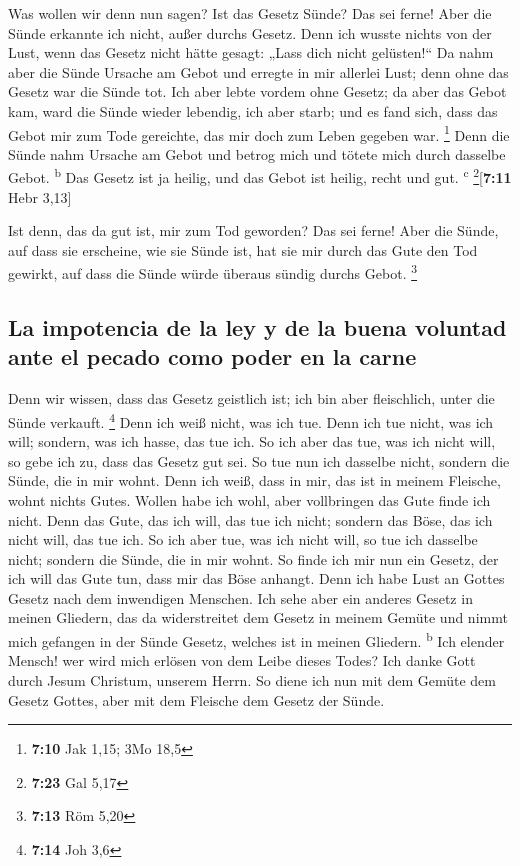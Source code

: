  Was wollen wir denn nun sagen? Ist das Gesetz Sünde? Das
sei ferne! Aber die Sünde erkannte ich nicht, außer durchs Gesetz. Denn
ich wusste nichts von der Lust, wenn das Gesetz nicht hätte gesagt:
„Lass dich nicht gelüsten!{}``  Da nahm aber die Sünde
Ursache am Gebot und erregte in mir allerlei Lust; denn ohne das Gesetz
war die Sünde tot.  Ich aber lebte vordem ohne Gesetz; da
aber das Gebot kam, ward die Sünde wieder lebendig,  ich
aber starb; und es fand sich, dass das Gebot mir zum Tode gereichte, das
mir doch zum Leben gegeben war. \footnote{\textbf{7:10} Jak 1,15; 3Mo
  18,5}  Denn die Sünde nahm Ursache am Gebot und betrog
mich und tötete mich durch dasselbe Gebot. \textsuperscript{b}
 Das Gesetz ist ja heilig, und das Gebot ist heilig,
recht und gut. \textsuperscript{c} \footnote{\textbf{7:23} Gal 5,17}{[}\textbf{7:11}
Hebr 3,13{]}

 Ist denn, das da gut ist, mir zum Tod geworden? Das sei
ferne! Aber die Sünde, auf dass sie erscheine, wie sie Sünde ist, hat
sie mir durch das Gute den Tod gewirkt, auf dass die Sünde würde überaus
sündig durchs Gebot. \footnote{\textbf{7:13} Röm 5,20}

\hypertarget{la-impotencia-de-la-ley-y-de-la-buena-voluntad-ante-el-pecado-como-poder-en-la-carne}{%
\subsection{La impotencia de la ley y de la buena voluntad ante el
pecado como poder en la
carne}\label{la-impotencia-de-la-ley-y-de-la-buena-voluntad-ante-el-pecado-como-poder-en-la-carne}}

 Denn wir wissen, dass das Gesetz geistlich ist; ich bin
aber fleischlich, unter die Sünde verkauft. \footnote{\textbf{7:14} Joh
  3,6}  Denn ich weiß nicht, was ich tue. Denn ich tue
nicht, was ich will; sondern, was ich hasse, das tue ich.
 So ich aber das tue, was ich nicht will, so gebe ich zu,
dass das Gesetz gut sei.  So tue nun ich dasselbe nicht,
sondern die Sünde, die in mir wohnt.  Denn ich weiß, dass
in mir, das ist in meinem Fleische, wohnt nichts Gutes. Wollen habe ich
wohl, aber vollbringen das Gute finde ich nicht.  Denn
das Gute, das ich will, das tue ich nicht; sondern das Böse, das ich
nicht will, das tue ich.  So ich aber tue, was ich nicht
will, so tue ich dasselbe nicht; sondern die Sünde, die in mir wohnt.
 So finde ich mir nun ein Gesetz, der ich will das Gute
tun, dass mir das Böse anhangt.  Denn ich habe Lust an
Gottes Gesetz nach dem inwendigen Menschen.  Ich sehe
aber ein anderes Gesetz in meinen Gliedern, das da widerstreitet dem
Gesetz in meinem Gemüte und nimmt mich gefangen in der Sünde Gesetz,
welches ist in meinen Gliedern. \textsuperscript{b}  Ich
elender Mensch! wer wird mich erlösen von dem Leibe dieses Todes?
 Ich danke Gott durch Jesum Christum, unserem Herrn. So
diene ich nun mit dem Gemüte dem Gesetz Gottes, aber mit dem Fleische
dem Gesetz der Sünde.

